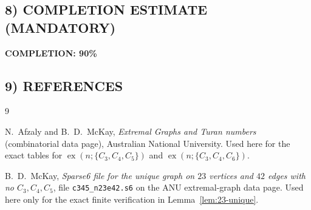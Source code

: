 \subsection*{8) COMPLETION ESTIMATE (MANDATORY)}

\textbf{COMPLETION: 90\%}

\subsection*{9) REFERENCES}

\begin{thebibliography}{9}

N.~Afzaly and B.~D.~McKay,
\emph{Extremal Graphs and Turan numbers} (combinatorial data page),
Australian National University.
Used here for the exact tables for
$\operatorname{ex}(n;\{C_3,C_4,C_5\})$ and
$\operatorname{ex}(n;\{C_3,C_4,C_6\})$.

B.~D.~McKay,
\emph{Sparse6 file for the unique graph on $23$ vertices and $42$ edges with no $C_3,C_4,C_5$},
file \texttt{c345\_n23e42.s6} on the ANU extremal-graph data page.
Used here only for the exact finite verification in Lemma~\ref{lem:23-unique}.

\end{thebibliography}
